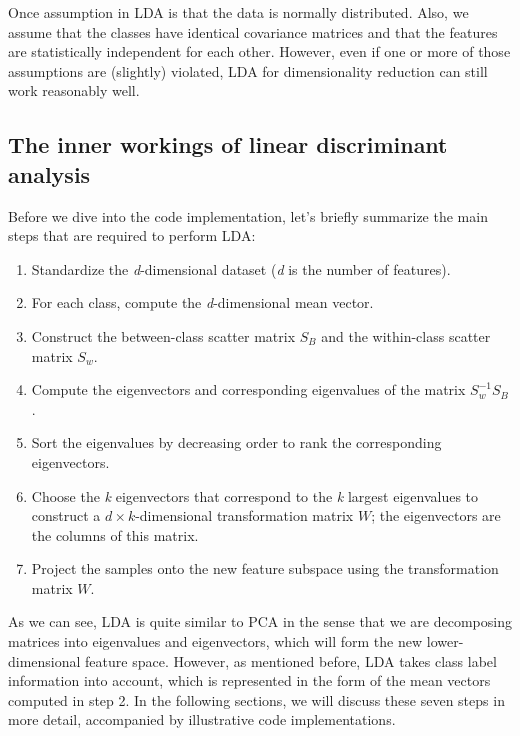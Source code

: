 \documentclass[11pt]{article}
\providecommand{\tightlist}{%
      \setlength{\itemsep}{0pt}\setlength{\parskip}{0pt}}
\begin{document}
Once assumption in LDA is that the data is normally distributed. Also,
we assume that the classes have identical covariance matrices and that
the features are statistically independent for each other. However, even
if one or more of those assumptions are (slightly) violated, LDA for
dimensionality reduction can still work reasonably well.

    \subsection{The inner workings of linear discriminant
analysis}\label{the-inner-workings-of-linear-discriminant-analysis}

    Before we dive into the code implementation, let's briefly summarize the
main steps that are required to perform LDA:

\begin{enumerate}
\def\labelenumi{\arabic{enumi}.}
\tightlist
\item
  Standardize the \emph{d}-dimensional dataset (\emph{d} is the number
  of features).
\item
  For each class, compute the \emph{d}-dimensional mean vector.
\item
  Construct the between-class scatter matrix \(S_B\) and the
  within-class scatter matrix \(S_w\).
\item
  Compute the eigenvectors and corresponding eigenvalues of the matrix
  \(S_w^{-1}S_B\).
\item
  Sort the eigenvalues by decreasing order to rank the corresponding
  eigenvectors.
\item
  Choose the \emph{k} eigenvectors that correspond to the \emph{k}
  largest eigenvalues to construct a \(d \times k\)-dimensional
  transformation matrix \(W\); the eigenvectors are the columns of this
  matrix.
\item
  Project the samples onto the new feature subspace using the
  transformation matrix \(W\).
\end{enumerate}

As we can see, LDA is quite similar to PCA in the sense that we are
decomposing matrices into eigenvalues and eigenvectors, which will form
the new lower-dimensional feature space. However, as mentioned before,
LDA takes class label information into account, which is represented in
the form of the mean vectors computed in step 2. In the following
sections, we will discuss these seven steps in more detail, accompanied
by illustrative code implementations.
\end{document}
